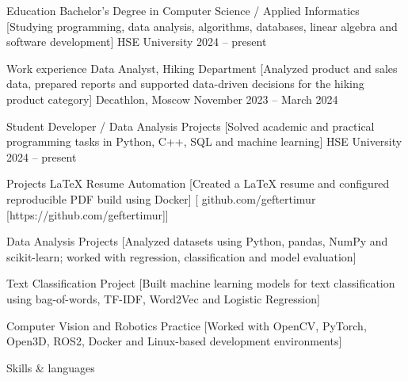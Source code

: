 \documentclass[
    compact
]{llresume}
\begin{document}
\makeheader

\begin{mainpane}
    \begin{mainsection}{Education}
        \entryJob
            {Bachelor's Degree in Computer Science / Applied Informatics}
            [Studying programming, data analysis, algorithms, databases, linear algebra and software development]
            {HSE University}
            {2024 -- present}
    \end{mainsection}

    \begin{mainsection}{Work experience}
        \entryJob
            {Data Analyst, Hiking Department}
            [Analyzed product and sales data, prepared reports and supported data-driven decisions for the hiking product category]
            {Decathlon, Moscow}
            {November 2023 -- March 2024}

        \entryJob
            {Student Developer / Data Analysis Projects}
            [Solved academic and practical programming tasks in Python, C++, SQL and machine learning]
            {HSE University}
            {2024 -- present}
    \end{mainsection}

    \begin{mainsection}{Projects}
        \entryGeneric
            {LaTeX Resume Automation}
            [Created a LaTeX resume and configured reproducible PDF build using Docker]
            [\infoGithub
                {github.com/geftertimur}
                [https://github.com/geftertimur]]

        \entryGeneric
            {Data Analysis Projects}
            [Analyzed datasets using Python, pandas, NumPy and scikit-learn; worked with regression, classification and model evaluation]

        \entryGeneric
            {Text Classification Project}
            [Built machine learning models for text classification using bag-of-words, TF-IDF, Word2Vec and Logistic Regression]

        \entryGeneric
            {Computer Vision and Robotics Practice}
            [Worked with OpenCV, PyTorch, Open3D, ROS2, Docker and Linux-based development environments]
    \end{mainsection}

    \begin{mainsection}{Skills \& languages}


\end{mainsection}
\end{mainpane}
\end{document}

